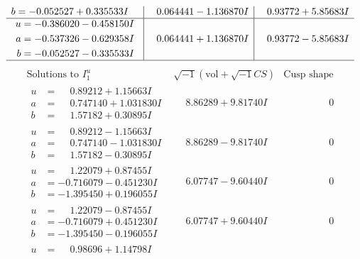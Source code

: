 \documentclass[1p]{elsarticle_modified}
\theoremstyle{definition}
\newcommand{\I}{\sqrt{-1}}
\begin{document}
$$\begin{array}{c|c|c}
\begin{aligned}
b &= -0.052527 + 0.335533 I\end{aligned}
 & \phantom{-}0.064441 - 1.136870 I & \phantom{-}0.93772 + 5.85683 I \\ \hline\begin{aligned}
u &= -0.386020 - 0.458150 I \\
a &= -0.537326 - 0.629358 I \\
b &= -0.052527 - 0.335533 I\end{aligned}
 & \phantom{-}0.064441 + 1.136870 I & \phantom{-}0.93772 - 5.85683 I\\
 \hline 
 \end{array}$$\newpage$$\begin{array}{c|c|c}  
\text{Solutions to }I^u_{1}& \I (\text{vol} + \sqrt{-1}CS) & \text{Cusp shape}\\
 \hline 
\begin{aligned}
u &= \phantom{-}0.89212 + 1.15663 I \\
a &= \phantom{-}0.747140 + 1.031830 I \\
b &= \phantom{-}1.57182 + 0.30895 I\end{aligned}
 & \phantom{-}8.86289 + 9.81740 I & \phantom{-0.000000 } 0 \\ \hline\begin{aligned}
u &= \phantom{-}0.89212 - 1.15663 I \\
a &= \phantom{-}0.747140 - 1.031830 I \\
b &= \phantom{-}1.57182 - 0.30895 I\end{aligned}
 & \phantom{-}8.86289 - 9.81740 I & \phantom{-0.000000 } 0 \\ \hline\begin{aligned}
u &= \phantom{-}1.22079 + 0.87455 I \\
a &= -0.716079 - 0.451230 I \\
b &= -1.395450 + 0.196055 I\end{aligned}
 & \phantom{-}6.07747 - 9.60440 I & \phantom{-0.000000 } 0 \\ \hline\begin{aligned}
u &= \phantom{-}1.22079 - 0.87455 I \\
a &= -0.716079 + 0.451230 I \\
b &= -1.395450 - 0.196055 I\end{aligned}
 & \phantom{-}6.07747 + 9.60440 I & \phantom{-0.000000 } 0 \\ \hline\begin{aligned}
u &= \phantom{-}0.98696 + 1.14798 I \\

\end{aligned}
\end{array}$$
\end{document}
